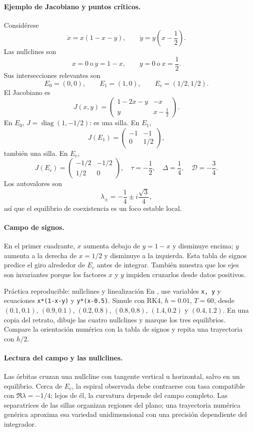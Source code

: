 \paragraph{Ejemplo de Jacobiano y puntos críticos.}
Considérese
\[
 \dot x=x(1-x-y),\qquad
 \dot y=y\left(x-\frac12\right).
\]
Las nullclines son
\[
 x=0\ \text{o}\ y=1-x,\qquad
 y=0\ \text{o}\ x=\frac12.
\]
Sus intersecciones relevantes son
\[
 E_0=(0,0),\qquad E_1=(1,0),\qquad E_c=(1/2,1/2).
\]
El Jacobiano es
\[
 J(x,y)=
 \begin{pmatrix}
 1-2x-y&-x\\
 y&x-\tfrac12
 \end{pmatrix}.
\]
En \(E_0\), \(J=\operatorname{diag}(1,-1/2)\): es una silla. En \(E_1\),
\[
 J(E_1)=\begin{pmatrix}-1&-1\\0&1/2\end{pmatrix},
\]
también una silla. En \(E_c\),
\[
 J(E_c)=
 \begin{pmatrix}-1/2&-1/2\\1/2&0\end{pmatrix},
\quad
 \tau=-\frac12,\quad\Delta=\frac14,\quad
 \mathcal D=-\frac34.
\]
Los autovalores son
\[
 \lambda_\pm=-\frac14\pm i\frac{\sqrt3}{4},
\]
así que el equilibrio de coexistencia es un foco estable local.

\paragraph{Campo de signos.}
En el primer cuadrante, \(x\) aumenta debajo de \(y=1-x\) y disminuye encima;
\(y\) aumenta a la derecha de \(x=1/2\) y disminuye a la izquierda. Esta tabla de
signos predice el giro alrededor de \(E_c\) antes de integrar. También muestra que los
ejes son invariantes porque los factores \(x\) y \(y\) impiden cruzarlos desde datos
positivos.

\begin{activitybox}{Práctica reproducible: nullclines y linealización}
En , use variables \texttt{x, y} y ecuaciones
\texttt{x*(1-x-y)} y \texttt{y*(x-0.5)}. Simule con RK4,
\(h=0.01\), \(T=60\), desde \((0.1,0.1)\), \((0.9,0.1)\), \((0.2,0.8)\),
\((0.8,0.8)\), \((1.4,0.2)\) y \((0.4,1.2)\). En una copia del retrato, dibuje las
cuatro nullclines y marque los tres equilibrios. Compare la orientación numérica con
la tabla de signos y repita una trayectoria con \(h/2\).
\end{activitybox}

\paragraph{Lectura del campo y las nullclines.}
Las órbitas cruzan una nullcline con tangente vertical u horizontal, salvo en un
equilibrio. Cerca de \(E_c\), la espiral observada debe contraerse con tasa compatible
con \(\Re\lambda=-1/4\); lejos de él, la curvatura depende del campo completo. Las
separatrices de las sillas organizan regiones del plano; una trayectoria
numérica genérica aproxima esa variedad unidimensional con una precisión dependiente del integrador.

